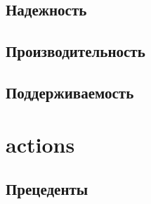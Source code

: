 \documentclass{article}
\begin{document}
  \subsection{Надежность}
  

  \subsection{Производительность}
  

  \subsection{Поддерживаемость}
  

\section{actions}

  \subsection{Прецеденты}
  
\end{document}
